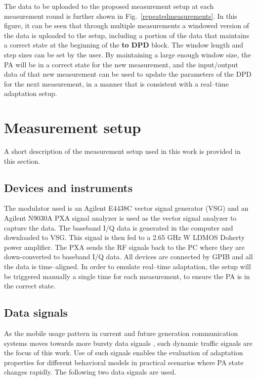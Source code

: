 \documentclass[journal]{IEEEtran}
\begin{document}
The data to be uploaded to the proposed measurement setup at each measurement round is further shown in Fig.~\ref{repeatedmeasurements}. In this figure, it can be seen that through multiple measurements a windowed version of the data is uploaded to the setup, including a portion of the data that maintains a correct state at the beginning of the \textbf{to DPD} block. The window length and step sizes can be set by the user. By maintaining a large enough window size, the PA will be in a correct state for the new measurement, and the input/output data of that new measurement can be used to update the parameters of the DPD for the next measurement, in a manner that is consistent with a real--time adaptation setup.


\section{Measurement setup}
A short description of the measurement setup used in this work is provided in this section.
\subsection{Devices and instruments}
The modulator used is an Agilent E4438C vector signal generator (VSG) and an Agilent N9030A PXA signal analyzer is used as the vector signal analyzer to capture the data. The baseband I/Q data is generated in the computer and
downloaded to VSG. This signal is then fed to a 2.65 GHz  W LDMOS Doherty power amplifier. The
PXA sends the RF signals back to the PC where they are
down-converted to baseband I/Q data. All devices are connected by
GPIB and all the data is time--aligned. In order to emulate real--time adaptation, the setup will be triggered manually a single time for each measurement, to ensure the PA is in the correct state.

\subsection{Data signals}
As the mobile usage pattern in current and future generation communication systems moves towards more bursty data signals \cite{soltaniims}, such dynamic traffic signals are the focus of this work. Use of such signals enables the evaluation of adaptation properties for different behavioral models in practical scenarios where PA state changes rapidly. The following two data signals are used.
\end{document}

